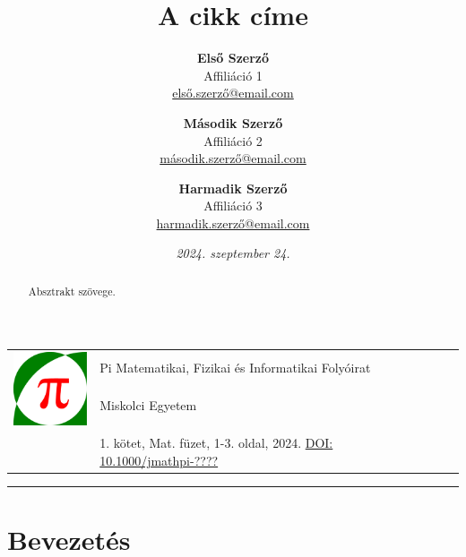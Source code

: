 \documentclass[a4paper,12pt]{article}
\theoremstyle{definition}
\begin{document}
\pagestyle{fancy}

\title{\sc A cikk címe}

\author{
	\textbf{Első Szerző} \\
	{\normalsize Affiliáció 1} \\
	{\normalsize \href{mailto:első.szerző@email.com}{első.szerző@email.com}}
\and
	\textbf{Második Szerző} \\
	{\normalsize Affiliáció 2} \\
	{\normalsize \href{mailto:második.szerző@email.com}{második.szerző@email.com}}
\and
	\textbf{Harmadik Szerző} \\
	{\normalsize Affiliáció 3} \\
	{\normalsize \href{mailto:harmadik.szerző@email.com}{harmadik.szerző@email.com}}
}

\date{\textit{2024. szeptember 24.}}

\noindent \begin{tabular}{lp{13cm}}
	\multirow{3}{*}{\includegraphics[width=22mm, height=22mm]{jmathpi_logo.pdf}}
	& Pi Matematikai, Fizikai és Informatikai Folyóirat \\
	& Miskolci Egyetem \\
	& \\
	& 1. kötet, Mat. füzet, 1-3. oldal, 2024. \hfill \href{https://doi.org/10.1000/jmathpi-1}{DOI: 10.1000/jmathpi-????} \\
\end{tabular}

\bigskip

\hrule

{\let\newpage\relax\maketitle}

\begin{abstract}
Absztrakt szövege.
\end{abstract}

{\def\thefootnote{}}

\section{Bevezetés}
\end{document}
